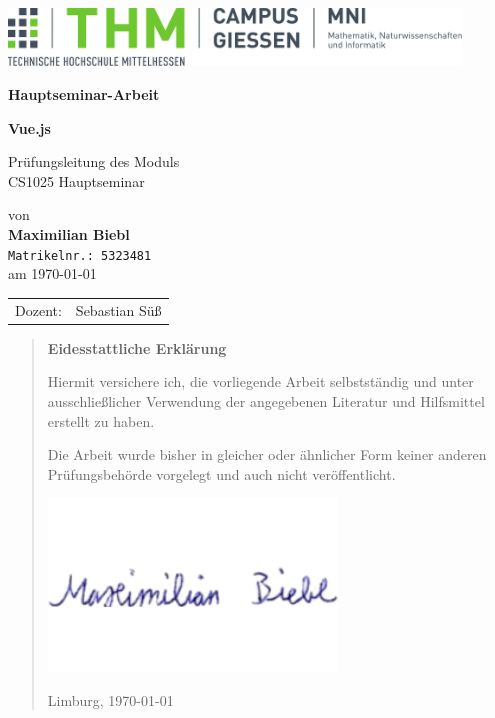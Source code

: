 \documentclass[%
	BCOR=8.25mm,         %
	DIV=12,              %
	parskip=half,				 %
	bibliography=totoc,	 %
	headsepline=on,      %
	]{scrbook}
\begin{document}
\frontmatter

\begin{titlepage}
	\begin{center}
	\includegraphics[width=0.9\textwidth]{img/mni-logo}
	
	\vspace{5cm}	

	\Large\textbf{\sffamily Hauptseminar-Arbeit}

	\vspace{1cm}	

	\huge\textbf{\sffamily Vue.js}

	\normalsize
	\vspace{1cm}

	Prüfungsleitung des Moduls \\
	CS1025 Hauptseminar

	von \\[1cm]	

	\textbf{Maximilian Biebl} \\ \texttt{Matrikelnr.: 5323481}\\ [.5cm]
	am \today
	\end{center}
	\vfill
	\begin{tabular}{ll}
		Dozent: & Sebastian Süß
	\end{tabular}
\end{titlepage}
\cleardoubleemptypage

\pagestyle{empty}
\begin{quote}
	\vspace*{4cm}

	\begin{center}
		\textbf{\Large\sffamily Eidesstattliche Erklärung}
	\end{center}

	Hiermit versichere ich, die vorliegende Arbeit selbstständig und unter
	ausschließlicher Verwendung der angegebenen Literatur und Hilfsmittel
	erstellt zu haben.

	Die Arbeit wurde bisher in gleicher oder ähnlicher Form keiner anderen
	Prüfungsbehörde vorgelegt und auch nicht veröffentlicht.

	\vspace{2em}
	\includegraphics[scale=0.5]{img/signature}

	Limburg, \today
\end{quote}
\cleardoubleemptypage
\end{document}
